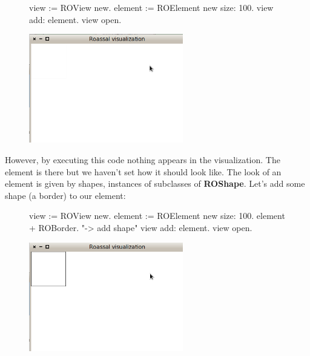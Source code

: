 \documentclass[a4paper,10pt,twoside]{book}
\begin{document}
\begin{figure}[H]
      \begin{minipage}[t]{0.5\textwidth}
      \vspace{0pt}
\begin{code}{}
view := ROView new.
element := ROElement new size: 100.
view add: element.
view open.
\end{code}
   \end{minipage}
   \hfill
   \begin{minipage}[t]{0.6\textwidth}
      \vspace{0pt} \raggedright
       \centering
		\includegraphics[width=0.6\textwidth]{ex1}
   \end{minipage}
\label{fig:ex1}
\end{figure}

However, by executing this code nothing appears in the visualization. The element is there but we haven't set how it should look like. The look of an element is given by shapes, instances of subclasses of \textbf{ROShape}. Let's add some shape (a border) to our element: 

\begin{figure}[H]
      \begin{minipage}[t]{0.5\textwidth}
      \vspace{0pt}
\begin{code}{}
view := ROView new.
element := ROElement new size: 100.
element 
	+ ROBorder. "-> add shape"
view add: element.
view open.
\end{code}
   \end{minipage}
   \hfill
   \begin{minipage}[t]{0.6\textwidth}
      \vspace{0pt} \raggedright
       \centering
		\includegraphics[width=0.6\textwidth]{ex2}
   \end{minipage}
\label{fig:ex2}
\end{figure}
\end{document}
